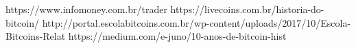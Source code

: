 https://www.infomoney.com.br/trader
https://livecoins.com.br/historia-do-bitcoin/
http://portal.escolabitcoins.com.br/wp-content/uploads/2017/10/Escola-Bitcoins-Relat%
https://medium.com/e-juno/10-anos-de-bitcoin-hist%
